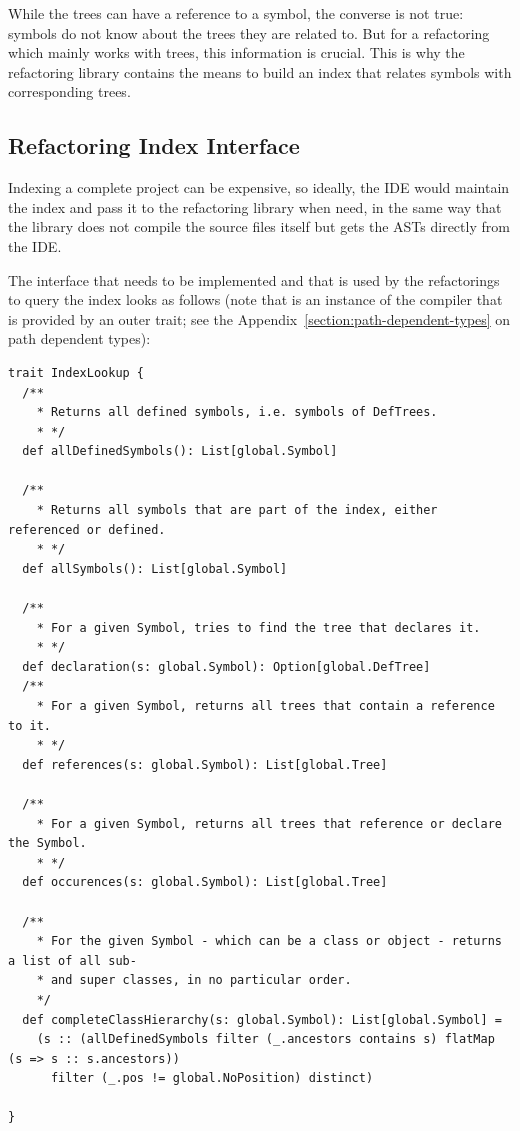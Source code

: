 While the trees can have a reference to a symbol, the converse is not true: symbols do not know about the trees they are related to. But for a refactoring which mainly works with trees, this information is crucial. This is why the refactoring library contains the means to build an index that relates symbols with corresponding trees.

\subsection{Refactoring Index Interface}

Indexing a complete project can be expensive, so ideally, the IDE would maintain the index and pass it to the refactoring library when need, in the same way that the library does not compile the source files itself but gets the ASTs directly from the IDE.

The interface that needs to be implemented and that is used by the refactorings to query the index looks as follows (note that  is an instance of the compiler that is provided by an outer trait; see the Appendix~\vref{section:path-dependent-types} on path dependent types):

\begin{lstlisting}
trait IndexLookup {
  /**
    * Returns all defined symbols, i.e. symbols of DefTrees.
    * */
  def allDefinedSymbols(): List[global.Symbol]
  
  /**
    * Returns all symbols that are part of the index, either referenced or defined.
    * */
  def allSymbols(): List[global.Symbol]    
  
  /**
    * For a given Symbol, tries to find the tree that declares it.
    * */
  def declaration(s: global.Symbol): Option[global.DefTree]
  /**
    * For a given Symbol, returns all trees that contain a reference to it.
    * */
  def references(s: global.Symbol): List[global.Tree]
  
  /**
    * For a given Symbol, returns all trees that reference or declare the Symbol.
    * */
  def occurences(s: global.Symbol): List[global.Tree]

  /**
    * For the given Symbol - which can be a class or object - returns a list of all sub- 
    * and super classes, in no particular order.
    */
  def completeClassHierarchy(s: global.Symbol): List[global.Symbol] =
    (s :: (allDefinedSymbols filter (_.ancestors contains s) flatMap (s => s :: s.ancestors)) 
      filter (_.pos != global.NoPosition) distinct)

}
\end{lstlisting}

